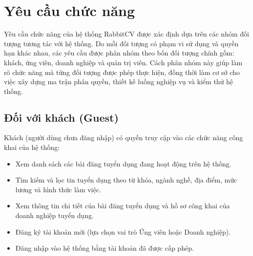\section{Yêu cầu chức năng}

Yêu cầu chức năng của hệ thống RabbitCV được xác định dựa trên các nhóm đối tượng tương tác với hệ thống. Do mỗi đối tượng có phạm vi sử dụng và quyền hạn khác nhau, các yêu cầu được phân nhóm theo bốn đối tượng chính gồm: khách, ứng viên, doanh nghiệp và quản trị viên. Cách phân nhóm này giúp làm rõ chức năng mà từng đối tượng được phép thực hiện, đồng thời làm cơ sở cho việc xây dựng ma trận phân quyền, thiết kế luồng nghiệp vụ và kiểm thử hệ thống.

\subsection{Đối với khách (Guest)}
Khách (người dùng chưa đăng nhập) có quyền truy cập vào các chức năng công khai của hệ thống:
\begin{itemize}
    \item Xem danh sách các bài đăng tuyển dụng đang hoạt động trên hệ thống.
    \item Tìm kiếm và lọc tin tuyển dụng theo từ khóa, ngành nghề, địa điểm, mức lương và hình thức làm việc.
    \item Xem thông tin chi tiết của bài đăng tuyển dụng và hồ sơ công khai của doanh nghiệp tuyển dụng.
    \item Đăng ký tài khoản mới (lựa chọn vai trò Ứng viên hoặc Doanh nghiệp).
    \item Đăng nhập vào hệ thống bằng tài khoản đã được cấp phép.
\end{itemize}

